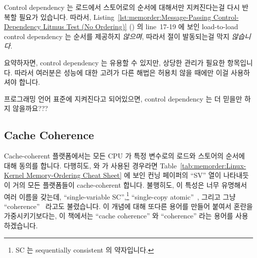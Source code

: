 Control dependency 는 로드에서 스토어로의 순서에 대해서만 지켜진다는걸 다시
반복할 필요가 있습니다.
따라서,
Listing~\ref{lst:memorder:Message-Passing Control-Dependency Litmus Test (No Ordering)}
()
의 line~17-19 에 보인 load-to-load control dependency 는 순서를 제공하지
\emph{않으며}, 따라서  절이 발동되는걸 막지 \emph{않습니다}.

요약하자면, control dependency 는 유용할 수 있지만, 상당한 관리가 필요한
항목입니다.
따라서 여러분은 성능에 대한 고려가 다른 해법은 허용치 않을 때에만 이걸
사용하셔야 합니다.

\QuickQuiz{}
	프로그래밍 언어 표준에 지켜진다고 되어있으면, control dependency 는 더
	믿을만 하지 않을까요???

\QuickQuizAnswer{
	시간이 흐르면, 어쩌면 그렇게 표준이 만들어질 수 있을 겁니다.

} \QuickQuizEnd

\subsection{Cache Coherence}
\label{sec:memorder:Cache Coherence}

Cache-coherent 플랫폼에서는 모든 CPU 가 특정 변수로의 로드와 스토어의 순서에
대해 동의를 합니다.
다행히도,  와  가 사용된 경우라면
Table~\ref{tab:memorder:Linux-Kernel Memory-Ordering Cheat Sheet}
에 보인 컨닝 페이퍼의 ``SV'' 열이 나타내듯이 거의 모든 플랫폼들이
cache-coherent 합니다.
불행히도, 이 특성은 너무 유명해서 여러 이름을 갖는데, ``single-variable
SC'',\footnote{
	SC 는 sequentially consistent 의 약자입니다.}
``single-copy atomic''~\cite{Stone:1995:SP:623262.623912}, 그리고 그냥
``coherence''~\cite{JadeAlglave2011ppcmem} 라고도 불렸습니다.
이 개념에 대해 또다른 용어를 만들어 붙여서 혼란을 가중시키기보다는, 이 책에서는
``cache coherence'' 와 ``coherence'' 라는 용어를 사용하겠습니다.
\iffalse

